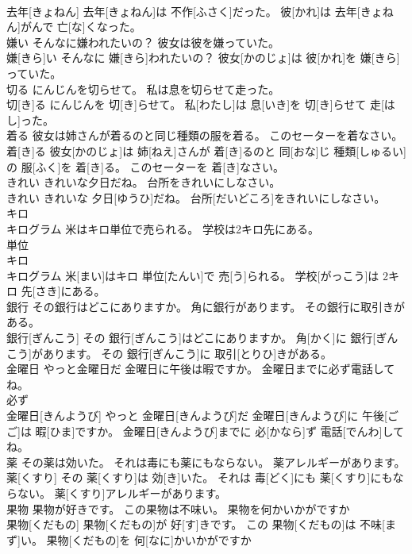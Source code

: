 \documentclass[8pt]{extreport}
\begin{document}
\begin{CJK}{UTF8}{min}
\\	去年[きょねん] 去年[きょねん]は 不作[ふさく]だった。 彼[かれ]は 去年[きょねん]がんで 亡[な]くなった。
\\	嫌い そんなに嫌われたいの？ 彼女は彼を嫌っていた。	
\\	嫌[きら]い そんなに 嫌[きら]われたいの？ 彼女[かのじょ]は 彼[かれ]を 嫌[きら]っていた。
\\	切る にんじんを切らせて。 私は息を切らせて走った。	
\\	切[き]る にんじんを 切[き]らせて。 私[わたし]は 息[いき]を 切[き]らせて 走[はし]った。
\\	着る 彼女は姉さんが着るのと同じ種類の服を着る。 このセーターを着なさい。	
\\	着[き]る 彼女[かのじょ]は 姉[ねえ]さんが 着[き]るのと 同[おな]じ 種類[しゅるい]の 服[ふく]を 着[き]る。 このセーターを 着[き]なさい。
\\	きれい きれいな夕日だね。 台所をきれいにしなさい。	
\\	きれい きれいな 夕日[ゆうひ]だね。 台所[だいどころ]をきれいにしなさい。
\\	キロ
\\	キログラム 米はキロ単位で売られる。 学校は2キロ先にある。	
\\	単位
\\	キロ
\\	キログラム 米[まい]はキロ 単位[たんい]で 売[う]られる。 学校[がっこう]は 2キロ 先[さき]にある。
\\	銀行 その銀行はどこにありますか。 角に銀行があります。 その銀行に取引きがある。	
\\	銀行[ぎんこう] その 銀行[ぎんこう]はどこにありますか。 角[かく]に 銀行[ぎんこう]があります。 その 銀行[ぎんこう]に 取引[とりひ]きがある。
\\	金曜日 やっと金曜日だ 金曜日に午後は暇ですか。 金曜日までに必ず電話してね。	
\\	必ず 
\\	金曜日[きんようび] やっと 金曜日[きんようび]だ 金曜日[きんようび]に 午後[ごご]は 暇[ひま]ですか。 金曜日[きんようび]までに 必[かなら]ず 電話[でんわ]してね。
\\	薬 その薬は効いた。 それは毒にも薬にもならない。 薬アレルギーがあります。	
\\	薬[くすり] その 薬[くすり]は 効[き]いた。 それは 毒[どく]にも 薬[くすり]にもならない。 薬[くすり]アレルギーがあります。
\\	果物 果物が好きです。 この果物は不味い。 果物を何かいかがですか	
\\	果物[くだもの] 果物[くだもの]が 好[す]きです。 この 果物[くだもの]は 不味[まず]い。 果物[くだもの]を 何[なに]かいかがですか

\end{CJK}
\end{document}
